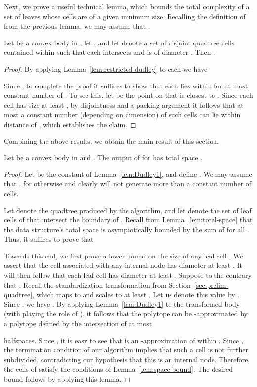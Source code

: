 \documentclass[11pt]{article}   \usepackage[letterpaper,hmargin=2.1cm,vmargin=3cm]{geometry}
\begin{document}
Next, we prove a useful technical lemma, which bounds the total complexity of a set of leaves whose cells are of a given minimum size. Recalling the definition of  from the previous lemma, we may assume that .

\begin{lemma} \label{lem:space-bound}
Let  be a convex body in , let , and let  denote a set of disjoint quadtree cells contained within  such that each intersects  and is of diameter . Then .
\end{lemma}


\begin{proof}
By applying Lemma~\ref{lem:restricted-dudley} to each  we have

Since , to complete the proof it suffices to show that each  lies within  for at most constant number of . To see this, let  be the point on  that is closest to . Since each cell  has size at least , by disjointness and a packing argument it follows that at most a constant number (depending on dimension) of such cells can lie within distance  of , which establishes the claim.
\end{proof}


Combining the above results, we obtain the main result of this section.

\begin{lemma} \label{lem:firstboundunit}
Let  be a convex body in  and . The output of  for  has total space .
\end{lemma}


\begin{proof}
Let  be the constant of Lemma~\ref{lem:Dudley1}, and define . We may assume that , for otherwise  and clearly  will not generate more than a constant number of cells. 

Let  denote the quadtree produced by the algorithm, and let  denote the set of leaf cells of  that intersect the boundary of . Recall from Lemma~\ref{lem:total-space} that the data structure's total space is asymptotically bounded by the sum of  for all . Thus, it suffices to prove that


Towards this end, we first prove a lower bound on the size of any leaf cell . We assert that the cell  associated with any internal node has diameter at least . It will then follow that each leaf cell has diameter at least . Suppose to the contrary that . Recall the standardization transformation from Section~\ref{sec:prelim-quadtree}, which maps  to  and scales  to at least . Let us denote this value by . Since , we have . By applying Lemma~\ref{lem:Dudley1} to the transformed body (with  playing the role of ), it follows that the polytope  can be -approximated by a polytope  defined by the intersection of at most 
 
halfspaces. Since , it is easy to see that  is an -approximation of  within . Since , the termination condition of our algorithm implies that such a cell is not further subdivided, contradicting our hypothesis that this is an internal node. Therefore, the cells of  satisfy the conditions of Lemma~\ref{lem:space-bound}. The desired bound follows by applying this lemma.
\end{proof}
\end{document}
